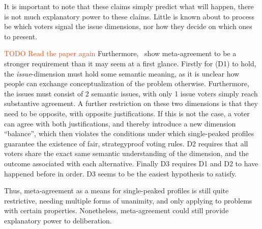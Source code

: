 It is important to note that these claims simply predict what will happen,
there is not much explanatory power to these claims. Little is known about to
process be which voters signal the issue dimensions, nor how they decide on
which ones to present.

\textcolor{OrangeRed}{TODO Read the paper again}
Furthermore,~\citet{ottonelliElusiveNotionMetaagreement2013} show
meta-agreement to be a stronger requirement than it may seem at a first glance.
Firstly for (D1) to hold, the \emph{issue}-dimension must hold some semantic
meaning, as it is unclear how people can exchange conceptualization
of the problem otherwise. Furthermore, the issues must consist of 2 semantic
issues, with only 1 issue voters simply reach substantive
agreement. A further restriction on these two dimensions is that they need to
be opposite, with opposite justifications. If this is not the case, a voter can
agree with both justifications, and thereby introduce a new dimension
``balance'', which then violates the conditions under which single-peaked
profiles guarantee the existence of fair, strategyproof voting rules. D2
requires that all voters share the exact same semantic understanding of the
dimension, and the outcome associated with each alternative. Finally D3
requires D1 and D2 to have happened before in order. D3 seems to be the easiest
hypothesis to satisfy.

Thus, meta-agreement as a means for single-peaked profiles is still quite
restrictive, needing multiple forms of unanimity, and only applying to problems
with certain properties. Nonetheless,  meta-agreement could still provide
explanatory power to deliberation.

